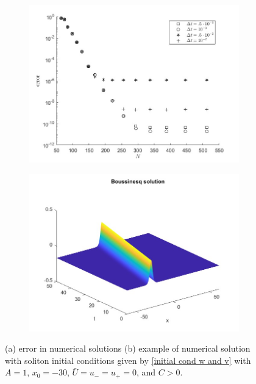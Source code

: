 \documentclass[12pt]{article}
\numberwithin{equation}{section}
\begin{document}
\begin{figure}
     \centering
     \begin{subfigure}[b]{.45\textwidth}
        \centering
        \includegraphics[width = \textwidth]{figures/errorbyN_Riemann_soliton.jpg}
         \caption{}
     \end{subfigure}
     \hfill
     \begin{subfigure}[b]{.45\textwidth}
        \centering
        \includegraphics[width = \textwidth]{figures/soliton_single_bouss.jpg}
         \caption{}
     \end{subfigure}
        \caption{(a) error in numerical solutions (b) example of numerical solution with soliton initial conditions given by \eqref{initial cond w and v} with $A = 1$, $x_0 = -30$, $\bar U = u_-=u_+ = 0$, and $C>0$.}
        \label{fig:riemann soliton}
\end{figure}
\end{document}
